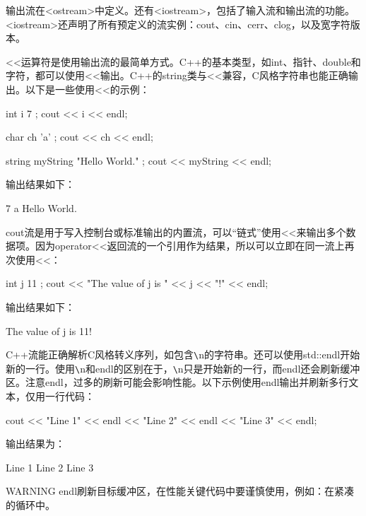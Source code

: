 
输出流在<ostream>中定义。还有<iostream>，包括了输入流和输出流的功能。<iostream>还声明了所有预定义的流实例：cout、cin、cerr、clog，以及宽字符版本。

<{}<运算符是使用输出流的最简单方式。C++的基本类型，如int、指针、double和字符，都可以使用<{}<输出。C++的string类与<{}<兼容，C风格字符串也能正确输出。以下是一些使用<{}<的示例：

\begin{cpp}
int i { 7 };
cout << i << endl;

char ch { 'a' };
cout << ch << endl;

string myString { "Hello World." };
cout << myString << endl;
\end{cpp}

输出结果如下：

\begin{shell}
7
a
Hello World.
\end{shell}

cout流是用于写入控制台或标准输出的内置流，可以“链式”使用<{}<来输出多个数据项。因为operator<{}<返回流的一个引用作为结果，所以可以立即在同一流上再次使用<{}<：

\begin{cpp}
int j { 11 };
cout << "The value of j is " << j << "!" << endl;
\end{cpp}

输出结果如下：

\begin{shell}
The value of j is 11!
\end{shell}

C++流能正确解析C风格转义序列，如包含\verb|\|n的字符串。还可以使用std::endl开始新的一行。使用\verb|\|n和endl的区别在于，\verb|\|n只是开始新的一行，而endl还会刷新缓冲区。注意endl，过多的刷新可能会影响性能。以下示例使用endl输出并刷新多行文本，仅用一行代码：

\begin{cpp}
cout << "Line 1" << endl << "Line 2" << endl << "Line 3" << endl;
\end{cpp}

输出结果为：

\begin{shell}
Line 1
Line 2
Line 3
\end{shell}

\begin{myWarning}{WARNING}
endl刷新目标缓冲区，在性能关键代码中要谨慎使用，例如：在紧凑的循环中。
\end{myWarning}

